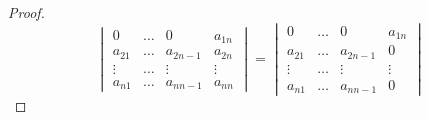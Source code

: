 \documentclass{book} %
\begin{document}
\begin{proof}
						\begin{equation}
							\begin{vmatrix}
								0 &   \dots & 0 & a_{1 n} \\
								a_{2 1} & \dots & a_{2 n-1} & a_{2 n} \\
								\vdots & \dots & \vdots & \vdots \\
								a_{n 1} & \dots & a_{n n-1}  & a_{n n}
							\end{vmatrix}
							= \begin{vmatrix}
								0 &   \dots & 0 & a_{1 n} \\
								a_{2 1} & \dots & a_{2 n-1} & 0 \\
								\vdots & \dots & \vdots & \vdots \\
								a_{n 1} & \dots & a_{n n-1}  & 0
							\end{vmatrix}
						\end{equation}
					\end{proof}
\end{document}
